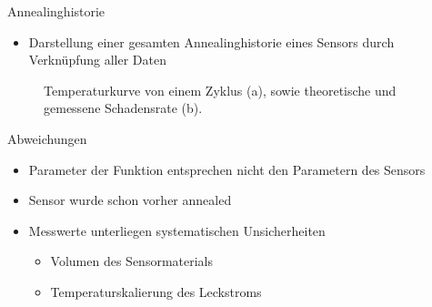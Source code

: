 \documentclass[aspectratio=1610, 9pt]{beamer}
\begin{document}
\begin{frame}{Annealinghistorie}
  \begin{itemize}
    \item Darstellung einer gesamten Annealinghistorie eines Sensors durch Verknüpfung aller Daten
  \end{itemize}
  \begin{figure}
      \caption{Temperaturkurve von einem Zyklus (a), sowie theoretische und gemessene Schadensrate (b).}
  \end{figure}

\end{frame}

\begin{frame}{Abweichungen}
  \begin{itemize}
    \item Parameter der Funktion entsprechen nicht den Parametern des Sensors
    \medskip
    \item Sensor wurde schon vorher annealed
    \medskip
    \item Messwerte unterliegen systematischen Unsicherheiten
    \medskip
    \begin{itemize}
      \item Volumen des Sensormaterials
      \medskip
      \item Temperaturskalierung des Leckstroms
    \end{itemize}
  \end{itemize}
\end{frame}
\end{document}

